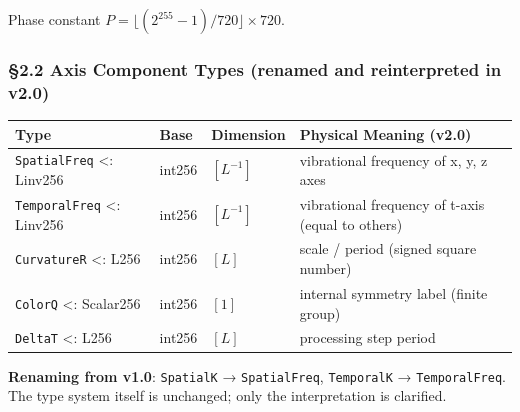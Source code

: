 \documentclass[a4paper,11pt]{article}
\newcounter{none}
\begin{document}
Phase constant \(P = \lfloor (2^{255}-1)/720 \rfloor \times 720\).

\subsubsection{§2.2 Axis Component Types (renamed and reinterpreted in
v2.0)}\label{axis-component-types-renamed-and-reinterpreted-in-v2.0}

{\def\LTcaptype{none} %
\begin{longtable}[]{@{}
  >{\raggedright\arraybackslash}p{}
  >{\raggedright\arraybackslash}p{}
  >{\raggedright\arraybackslash}p{}
  >{\raggedright\arraybackslash}p{}@{}}
\toprule\noalign{}
\begin{minipage}[b]{\linewidth}\raggedright
Type
\end{minipage} & \begin{minipage}[b]{\linewidth}\raggedright
Base
\end{minipage} & \begin{minipage}[b]{\linewidth}\raggedright
Dimension
\end{minipage} & \begin{minipage}[b]{\linewidth}\raggedright
Physical Meaning (v2.0)
\end{minipage} \\
\midrule\noalign{}
\endhead
\bottomrule\noalign{}
\endlastfoot
\texttt{SpatialFreq} \textless: Linv256 & int256 & \([L^{-1}]\) &
vibrational frequency of x, y, z axes \\
\texttt{TemporalFreq} \textless: Linv256 & int256 & \([L^{-1}]\) &
vibrational frequency of t-axis (equal to others) \\
\texttt{CurvatureR} \textless: L256 & int256 & \([L]\) & scale / period
(signed square number) \\
\texttt{ColorQ} \textless: Scalar256 & int256 & \([1]\) & internal
symmetry label (finite group) \\
\texttt{DeltaT} \textless: L256 & int256 & \([L]\) & processing step
period \\
\end{longtable}
}

\textbf{Renaming from v1.0}: \texttt{SpatialK} → \texttt{SpatialFreq},
\texttt{TemporalK} → \texttt{TemporalFreq}. The type system itself is
unchanged; only the interpretation is clarified.
\end{document}
